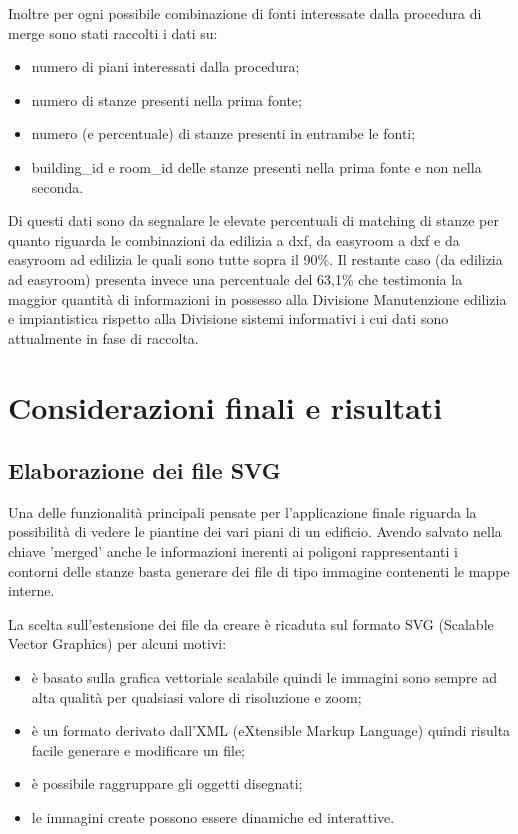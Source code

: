 \documentclass[12pt]{report}
\begin{document}
Inoltre per ogni possibile combinazione di fonti interessate dalla procedura di merge sono stati raccolti i dati su:
\begin{itemize}
\item numero di piani interessati dalla procedura;
\item numero di stanze presenti nella prima fonte;
\item numero (e percentuale) di stanze presenti in entrambe le fonti;
\item building\_id e room\_id delle stanze presenti nella prima fonte e non nella seconda.
\end{itemize}

Di questi dati sono da segnalare le elevate percentuali di matching di stanze per quanto riguarda le combinazioni da edilizia a dxf, da easyroom a dxf e da easyroom ad edilizia le quali sono tutte sopra il 90\%.
Il restante caso (da edilizia ad easyroom) presenta invece una percentuale del 63,1\% che testimonia la maggior quantità di informazioni in possesso alla Divisione Manutenzione edilizia e impiantistica rispetto alla Divisione sistemi informativi i cui dati sono attualmente in fase di raccolta.


\chapter{Considerazioni finali e risultati}
\label{Considerazioni-finali}

\section{Elaborazione dei file SVG}

Una delle funzionalità principali pensate per l'applicazione finale riguarda la possibilità di vedere le piantine dei vari piani di un edificio.
Avendo salvato nella chiave 'merged' anche le informazioni inerenti ai poligoni rappresentanti i contorni delle stanze basta generare dei file di tipo immagine contenenti le mappe interne.

La scelta sull'estensione dei file da creare è ricaduta sul formato SVG (Scalable Vector Graphics) per alcuni motivi:
\begin{itemize}
\item è basato sulla grafica vettoriale scalabile quindi le immagini sono sempre ad alta qualità per qualsiasi valore di risoluzione e zoom;
\item è un formato derivato dall'XML (eXtensible Markup Language) quindi risulta facile generare e modificare un file;
\item è possibile raggruppare gli oggetti disegnati;
\item le immagini create possono essere dinamiche ed interattive. 
\end{itemize}
\end{document}
